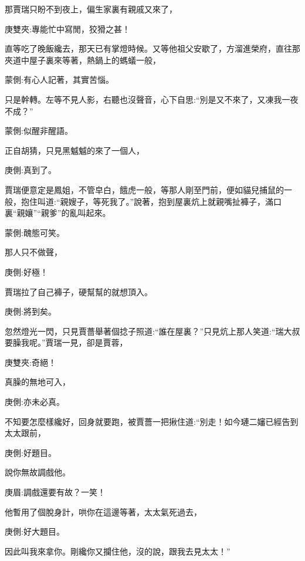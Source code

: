 \begin{parag}
    那賈瑞只盼不到夜上，偏生家裏有親戚又來了，\begin{note}庚雙夾:專能忙中寫閒，狡猾之甚！\end{note}直等吃了晚飯纔去，那天已有掌燈時候。又等他祖父安歇了，方溜進榮府，直往那夾道中屋子裏來等著，熱鍋上的螞蟻一般，\begin{note}蒙側:有心人記著，其實苦惱。\end{note}只是幹轉。左等不見人影，右聽也沒聲音，心下自思:“別是又不來了，又凍我一夜不成？”\begin{note}蒙側:似醒非醒語。\end{note}正自胡猜，只見黑魆魆的來了一個人，\begin{note}庚側:真到了。\end{note}賈瑞便意定是鳳姐，不管皁白，餓虎一般，等那人剛至門前，便如貓兒捕鼠的一般，抱住叫道:“親嫂子，等死我了。”說著，抱到屋裏炕上就親嘴扯褲子，滿口裏“親孃”“親爹”的亂叫起來。\begin{note}蒙側:醜態可笑。\end{note}那人只不做聲，\begin{note}庚側:好極！\end{note}賈瑞拉了自己褲子，硬幫幫的就想頂入。\begin{note}庚側:將到矣。\end{note}忽然燈光一閃，只見賈薔舉著個捻子照道:“誰在屋裏？”只見炕上那人笑道:“瑞大叔要臊我呢。”賈瑞一見，卻是賈蓉，\begin{note}庚雙夾:奇絕！\end{note}真臊的無地可入，\begin{note}庚側:亦未必真。\end{note}不知要怎麼樣纔好，回身就要跑，被賈薔一把揪住道:“別走！如今璉二嬸已經告到太太跟前，\begin{note}庚側:好題目。\end{note}說你無故調戲他。\begin{note}庚眉:調戲還要有故？一笑！\end{note}他暫用了個脫身計，哄你在這邊等著，太太氣死過去，\begin{note}庚側:好大題目。\end{note}因此叫我來拿你。剛纔你又攔住他，沒的說，跟我去見太太！”
\end{parag}



